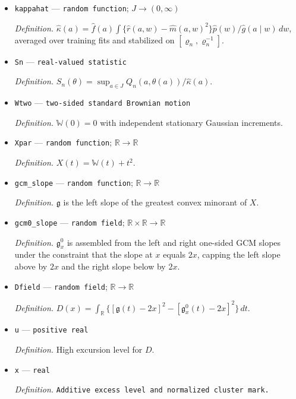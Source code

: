 \documentclass{article}
\begin{document}
\begin{itemize}
  \item \texttt{kappahat} --- \texttt{random function}; \(J\to(0,\infty)\)
  \par\smallskip\noindent\emph{Definition.} \(\widehat\kappa(a)=\widehat f(a)\int\{\widehat r(a,w)-\widehat m(a,w)^2\}\widehat p(w)/\widehat g(a\mid w)\,dw\), averaged over training fits and stabilized on \([\varrho_n,\varrho_n^{-1}]\).
  \item \texttt{Sn} --- \texttt{real-\allowbreak{}valued statistic}
  \par\smallskip\noindent\emph{Definition.} \(S_n(\theta)=\sup_{a\in J}Q_n(a,\theta(a))/\widehat\kappa(a)\).
  \item \texttt{Wtwo} --- \texttt{two-\allowbreak{}sided standard Brownian motion}
  \par\smallskip\noindent\emph{Definition.} \(\mathbb W(0)=0\) with independent stationary Gaussian increments.
  \item \texttt{Xpar} --- \texttt{random function}; \(\mathbb R\to\mathbb R\)
  \par\smallskip\noindent\emph{Definition.} \(X(t)=\mathbb W(t)+t^2\).
  \item \texttt{gcm\_\allowbreak{}slope} --- \texttt{random function}; \(\mathbb R\to\mathbb R\)
  \par\smallskip\noindent\emph{Definition.} \(\mathfrak g\) is the left slope of the greatest convex minorant of \(X\).
  \item \texttt{gcm0\_\allowbreak{}slope} --- \texttt{random field}; \(\mathbb R\times\mathbb R\to\mathbb R\)
  \par\smallskip\noindent\emph{Definition.} \(\mathfrak g_x^{0}\) is assembled from the left and right one-sided GCM slopes under the constraint that the slope at \(x\) equals \(2x\), capping the left slope above by \(2x\) and the right slope below by \(2x\).
  \item \texttt{Dfield} --- \texttt{random field}; \(\mathbb R\to\mathbb R\)
  \par\smallskip\noindent\emph{Definition.} \(D(x)=\int_{\mathbb R}\{[\mathfrak g(t)-2x]^2-[\mathfrak g_x^{0}(t)-2x]^2\}\,dt\).
  \item \texttt{u} --- \texttt{positive real}
  \par\smallskip\noindent\emph{Definition.} High excursion level for \(D\).
  \item \texttt{x} --- \texttt{real}
  \par\smallskip\noindent\emph{Definition.} \texttt{Additive excess level and normalized cluster mark.}

\end{itemize}
\end{document}
